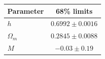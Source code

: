 \begin{tabular} { l  c}

 Parameter &  68\% limits\\
\hline
{\boldmath$h              $} & $0.6992\pm 0.0016          $\\

{\boldmath$Ω_m            $} & $0.2845\pm 0.0088          $\\

{\boldmath$M              $} & $-0.03\pm 0.19             $\\
\hline
\end{tabular}
